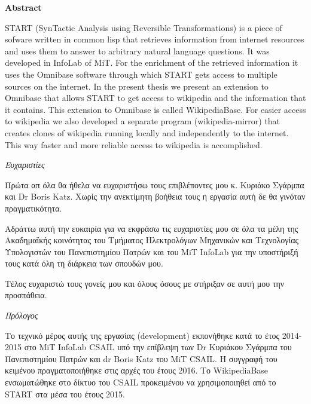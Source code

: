 {\vfill

\large\textbf{Abstract}

  START (SynTactic Analysis using Reversible Transformations) is a
  piece of sofware written in common lisp that retrieves information
  from internet resources and uses them to answer to arbitrary natural
  language questions. It was developed in InfoLab of MiT. For the
  enrichment of the retrieved information it uses the Omnibase
  software through which START gets access to multiple sources on the
  internet. In the present thesis we present an extension to Omnibase
  that allows START to get access to wikipedia and the information
  that it contains. This extension to Omnibase is called
  WikipediaBase. For easier access to wikipedia we also developed a
  separate program (wikipedia-mirror) that creates clones of wikipedia
  running locally and independently to the internet. This way faster
  and more reliable access to wikipedia is accomplished.


\clearpage

  \thispagestyle{plain}
  \vspace*{1in}
  \begin{center}
    \begin{Large}
      \textit{Ευχαριστίες}
    \end{Large}
  \end{center}

  Πρώτα απ όλα θα ήθελα να ευχαριστήσω τους επιβλέποντες μου κ. Κυριάκο
  Σγάρμπα και Dr Boris Katz. Χωρίς την ανεκτίμητη βοήθεια τους η εργασία
  αυτή δε θα γινόταν πραγματικότητα.

  Αδράττω αυτή την ευκαιρία για να εκφράσω τις ευχαριστίες μου σε όλα τα
  μέλη της Ακαδημαϊκής κοινότητας του Τμήματος Ηλεκτρολόγων Μηχανικών
  και Τεχνολογίας Υπολογιστών του Πανεπιστημίου Πατρών και του MiT
  InfoLab για την υποστήριξή τους κατά όλη τη διάρκεια των σπουδών μου.


  Τέλος ευχαριστώ τους γονείς μου και όλους όσους με στήριξαν σε αυτή
  μου την προσπάθεια.

  \afterpage{\blankpage}
  \newpage

  \thispagestyle{plain}
  \vspace*{1in}
  \begin{center}
    \begin{Large}
      \textit{Πρόλογος}
    \end{Large}
  \end{center}

  Το τεχνικό μέρος αυτής της εργασίας (development) εκπονήθηκε κατά το
  έτος 2014-2015 στο MiT InfoLab CSAIL υπό την επίβλεψη των Dr
  Κυριάκου Σγάρμπα του Πανεπιστημίου Πατρών και dr Boris Katz του MiT
  CSAIL. Η συγγραφή του κειμένου πραγματοποιήθηκε στις αρχές του έτους
  2016. Το WikipediaBase ενσωματώθηκε στο δίκτυο του CSAIL προκειμένου
  να χρησιμοποιηθεί από το START στα μέσα του έτους 2015.

  \afterpage{\blankpage}


}
